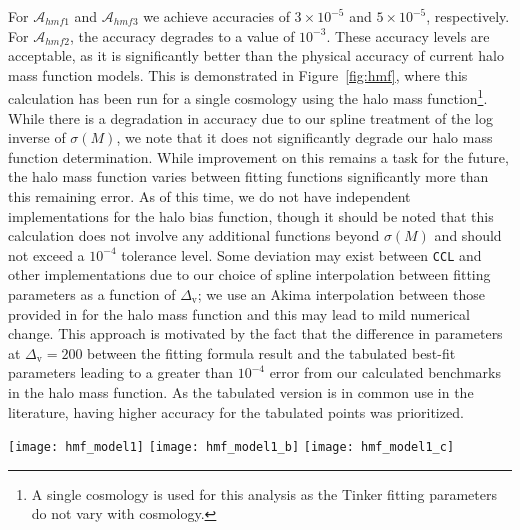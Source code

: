 \documentclass[\docopts]{\docclass}
\newcommand{\ccl}{{\tt CCL}\xspace}
\begin{document}
For $\mathcal{A}_{hmf1}$ and $\mathcal{A}_{hmf3}$ we achieve accuracies of $3\times 10^{-5}$ and $5 \times 10^{-5}$, respectively. For $\mathcal{A}_{hmf2}$, the accuracy degrades to a value of $10^{-3}$. These accuracy levels are acceptable, as it is significantly better than the physical accuracy of current halo mass function models. This is demonstrated in Figure~\ref{fig:hmf}, where this calculation has been run for a single cosmology using the \citet{Tinker2010} halo mass function\footnote{A single cosmology is used for this analysis as the Tinker fitting parameters do not vary with cosmology.}. While there is a degradation in accuracy due to our spline treatment of the log inverse of $\sigma(M)$, we note that it does not significantly degrade our halo mass function determination. While improvement on this remains a task for the future, the halo mass function varies between fitting functions significantly more than this remaining error. As of this time, we do not have independent implementations for the halo bias function, though it should be noted that this calculation does not involve any additional functions beyond $\sigma(M)$ and should not exceed a $10^{-4}$ tolerance level. Some deviation may exist between \ccl and other implementations due to our choice of spline interpolation between \citet{Tinker2010} fitting parameters as a function of $\Delta_\mathrm{v}$; we use an Akima interpolation between those provided in \citet{Tinker2010} for the halo mass function and this may lead to mild numerical change. This approach is motivated by the fact that the difference in parameters at $\Delta_\mathrm{v} = 200$ between the fitting formula result and the tabulated best-fit parameters leading to a greater than $10^{-4}$ error from our calculated benchmarks in the halo mass function. As the tabulated version is in common use in the literature, having higher accuracy for the tabulated points was prioritized.

\begin{figure*}
\texttt{[image: hmf\_model1]}
\texttt{[image: hmf\_model1\_b]}
\texttt{[image: hmf\_model1\_c]}
\caption{Three different numerical tests of the halo mass function calculation. In each line, the blue line is the fractional error in the function, while the black dashed line represents our error tolerance. The first panel demonstrates the robust calculation of $\sigma(M)$. The second panel demonstrates a numerical quirk in our spline treatment that is currently not addressed, but does reduce the numerical accuracy in returning the log inverse of $\sigma(M)$. We note that this does not significantly impact the error in the halo mass function in the final panel.}
\label{fig:hmf}
\end{figure*}
\end{document}
